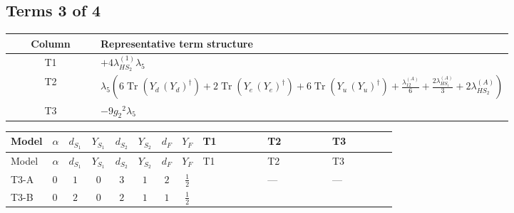 \documentclass[8pt]{article}
\begin{document}
\begin{landscape}
\subsection*{Terms 3 of 4}
\begin{center}
\begin{tabular}{@{}c >{\raggedright\arraybackslash}p{0.82\linewidth}@{}}
\toprule
Column & Representative term structure \\
\midrule
T1 & \(\displaystyle +4 {\lambda_{HS_2}^{(1)}} {\lambda_5}\) \\
\midrule
T2 & \(\displaystyle {\lambda_5} \left(6 \operatorname{Tr}\!\left({Y_d}\,\left({Y_d}\right)^{\dagger}\right)+2 \operatorname{Tr}\!\left({Y_e}\,\left({Y_e}\right)^{\dagger}\right)+6 \operatorname{Tr}\!\left({Y_u}\,\left({Y_u}\right)^{\dagger}\right)+\frac{{\lambda_{12}^{(A)}}}{6}+\frac{2 {\lambda_{HS_1}^{(A)}}}{3}+2 {\lambda_{HS_2}^{(A)}}\right)\) \\
\midrule
T3 & \(\displaystyle -9 {g_2}^2 {\lambda_5}\) \\
\midrule
\bottomrule
\end{tabular}
\end{center}
\smallskip
\tiny
\begin{longtable}{@{}llcccccc >{\raggedright\arraybackslash}p{0.21\linewidth} >{\raggedright\arraybackslash}p{0.21\linewidth} >{\raggedright\arraybackslash}p{0.21\linewidth}@{}}
\toprule
Model & $\alpha$ & $d_{S_1}$ & $Y_{S_1}$ & $d_{S_2}$ & $Y_{S_2}$ & $d_F$ & $Y_F$ & T1 & T2 & T3 \\
\midrule
\endfirsthead
\toprule
Model & $\alpha$ & $d_{S_1}$ & $Y_{S_1}$ & $d_{S_2}$ & $Y_{S_2}$ & $d_F$ & $Y_F$ & T1 & T2 & T3 \\
\midrule
\endhead
T3-A & $0$ & $1$ & $0$ & $3$ & $1$ & $2$ & $\frac{1}{2}$ & \scriptsize\adjustbox{max width=\linewidth}{$\begin{gathered} +4 {\lambda_{HS_2}^{(1)}} {\lambda_5}\end{gathered}$} & --- & --- \\
\midrule
T3-B & $0$ & $2$ & $0$ & $2$ & $1$ & $1$ & $\frac{1}{2}$ & \scriptsize\adjustbox{max width=\linewidth}{$\begin{gathered} +4 {\lambda_{HS_2}^{(1)}} {\lambda_5}\end{gathered}$} & \scriptsize\adjustbox{max width=\linewidth}{$\begin{gathered} {\lambda_5} \left(6 \operatorname{Tr}\!\left({Y_d}\,\left({Y_d}\right)^{\dagger}\right)+2 \operatorname{Tr}\!\left({Y_e}\,\left({Y_e}\right)^{\dagger}\right)+6 \operatorname{Tr}\!\left({Y_u}\,\left({Y_u}\right)^{\dagger}\right)+\frac{{\lambda_{12}^{(A)}}}{6}+\frac{2 {\lambda_{HS_1}^{(A)}}}{3}+2 {\lambda_{HS_2}^{(A)}}\right)\end{gathered}$} & \scriptsize\adjustbox{max width=\linewidth}{$\begin{gathered} -9 {g_2}^2 {\lambda_5}\end{gathered}$} \\

\end{longtable}
\end{landscape}
\end{document}
